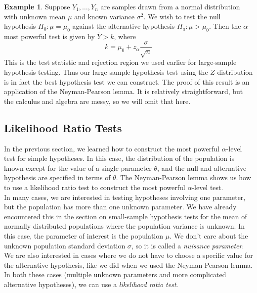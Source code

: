 \documentclass[12pt]{article}
\theoremstyle{definition}
\newtheorem*{example}{Example}
\theoremstyle{remark}
\begin{document}
\begin{example}
Suppose $Y_1, \dots, Y_n$ are samples drawn from a normal distribution with unknown mean $\mu$ and known variance $\sigma^2$. We wish to test the null hypothesis $H_0: \mu = \mu_0$ against the alternative hypothesis $H_a: \mu > \mu_0$. Then the $\alpha$-most powerful test is given by $\bar{Y} > k$, where
\[
k = \mu_0 + z_\alpha\frac{\sigma}{\sqrt{n}}
\]
This is the test statistic and rejection region we used earlier for large-sample hypothesis testing. Thus our large sample hypothesis test using the $Z$-distribution is in fact the best hypothesis test we can construct. The proof of this result is an application of the Neyman-Pearson lemma. It is relatively straightforward, but the calculus and algebra are messy, so we will omit that here.
\end{example}

\subsection{Likelihood Ratio Tests}
In the previous section, we learned how to construct the most powerful $\alpha$-level test for simple hypotheses. In this case, the distribution of the population is known except for the value of a single parameter $\theta$, and the null and alternative hypothesis are specified in terms of $\theta$. The Neyman-Pearson lemma shows us how to use a likelihood ratio test to construct the most powerful $\alpha$-level test.\\

In many cases, we are interested in testing hypotheses involving one parameter, but the population has more than one unknown parameter. We have already encountered this in the section on small-sample hypothesis tests for the mean of normally distributed populations where the population variance is unknown. In this case, the parameter of interest is the population $\mu$. We don't care about the unknown population standard deviation $\sigma$, so it is called a \emph{nuisance parameter}. We are also interested in cases where we do not have to choose a specific value for the alternative hypothesis, like we did when we used the Neyman-Pearson lemma. In both these cases (multiple unknown parameters and more complicated alternative hypotheses), we can use a \emph{likelihood ratio test}.\\
\end{document}
